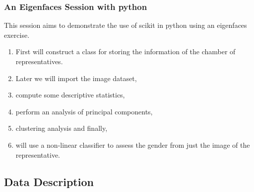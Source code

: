 \documentclass[10pt, colorlinks]{beamer}
\begin{document}
\begin{frame}
	\frametitle{  An Eigenfaces Session with python }
This session aims to demonstrate the use of scikit in python using an eigenfaces exercise. 
\begin{enumerate}
    \item First will construct a class for storing the information of the chamber of representatives. 
    \item Later we will import the image dataset, 
    \item compute some descriptive statistics, 
    \item perform an analysis of principal components,
    \item clustering analysis and finally, 
    \item will use a non-linear classifier to assess the gender from just the image of the representative.

\end{enumerate}
\end{frame}



\subsection{Data Description}
\end{document}
